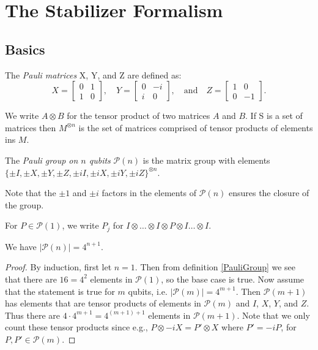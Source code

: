 \documentclass[12pt]{dalthesis}
\begin{document}
\chapter{The Stabilizer Formalism}
\section{Basics}

\begin{definition}
The \emph{Pauli matrices} X, Y, and Z are defined as:
  \[
  X= \begin{bmatrix}
    0 & 1 \\
    1 & 0
  \end{bmatrix}, \quad
  Y = \begin{bmatrix}
  0 & -i \\
  i & 0
  \end{bmatrix}, \quad \mbox{and} \quad
  Z = \begin{bmatrix}
  1 & 0 \\
  0 & -1
  \end{bmatrix}.
  \]
\end{definition}

We write $A \otimes B$ for the tensor product of two matrices $A$ and $B$. If S is a set of matrices then $M^{\otimes n}$ is the set of matrices comprised of tensor products of elements ins $M$.

\begin{definition}
\label{PauliGroup}
The \emph{Pauli group on $n$ qubits} $\mathcal{P}(n)$ is the matrix group with elements $\{ \pm I, \pm X, \pm Y, \pm Z, \pm iI, \pm iX, \pm iY, \pm iZ \}^{\otimes n}$.
\end{definition}

Note that the $\pm 1$ and $\pm i$ factors in the elements of $\mathcal{P}(n)$ ensures the closure of the group.

\begin{definition}
For $P \in \mathcal{P}(1)$, we write $P_j$ for $I \otimes \dots \otimes I \otimes P \otimes I \dots \otimes I$.
\end{definition}

\begin{proposition}
We have $|\mathcal{P}(n)|=4^{n+1}$.
\end{proposition}

\begin{proof}
By induction, first let $n=1$. Then from definition \ref{PauliGroup} we see that there are $16 = 4^2$ elements in $\mathcal{P}(1)$, so the base case is true. Now assume that the statement is true for $m$ qubits, i.e. $|\mathcal{P}(m)| = 4^{m+1}$. Then $\mathcal{P}(m+1)$ has elements that are tensor products of elements in $\mathcal{P}(m)$ and $I$, $X$, $Y$, and $Z$. Thus there are $4 \cdot 4^{m+1} = 4^{(m+1)+1}$ elements in $\mathcal{P}(m+1)$. Note that we only count these tensor products since e.g., $P \otimes -iX = P' \otimes X$ where $P' = -iP$, for $P, P' \in \mathcal{P}(m)$.
\end{proof}
\end{document}
